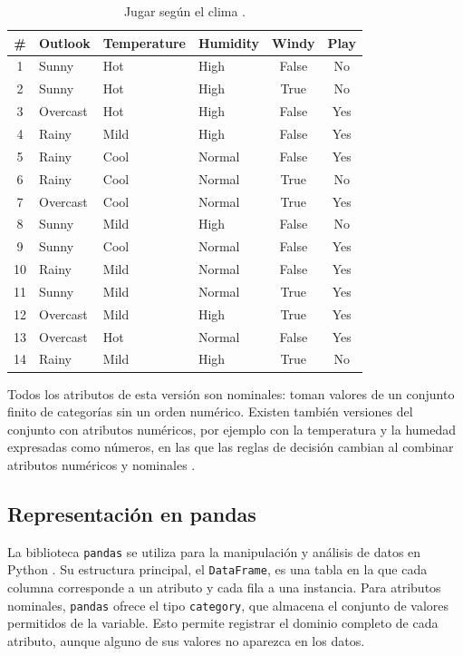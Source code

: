 \documentclass[11pt,letterpaper]{article}
\begin{document}
\begin{table}[htbp]
\centering
\caption{Jugar según el clima \parencite{tecnm2026_documento_fuente}.}
\label{tab:weather}
\begin{tabular}{clllcc}
\hline
\textbf{\#} & \textbf{Outlook} & \textbf{Temperature} & \textbf{Humidity} & \textbf{Windy} & \textbf{Play} \\
\hline
1  & Sunny    & Hot  & High   & False & No  \\
2  & Sunny    & Hot  & High   & True  & No  \\
3  & Overcast & Hot  & High   & False & Yes \\
4  & Rainy    & Mild & High   & False & Yes \\
5  & Rainy    & Cool & Normal & False & Yes \\
6  & Rainy    & Cool & Normal & True  & No  \\
7  & Overcast & Cool & Normal & True  & Yes \\
8  & Sunny    & Mild & High   & False & No  \\
9  & Sunny    & Cool & Normal & False & Yes \\
10 & Rainy    & Mild & Normal & False & Yes \\
11 & Sunny    & Mild & Normal & True  & Yes \\
12 & Overcast & Mild & High   & True  & Yes \\
13 & Overcast & Hot  & Normal & False & Yes \\
14 & Rainy    & Mild & High   & True  & No  \\
\hline
\end{tabular}
\end{table}

Todos los atributos de esta versión son nominales: toman valores de un conjunto finito de categorías sin un orden numérico. Existen también versiones del conjunto con atributos numéricos, por ejemplo con la temperatura y la humedad expresadas como números, en las que las reglas de decisión cambian al combinar atributos numéricos y nominales \parencite{tecnm2026_documento_fuente}.

\subsection{Representación en pandas}

La biblioteca \texttt{pandas} se utiliza para la manipulación y análisis de datos en Python \parencite{tecnm2026_documento_fuente}. Su estructura principal, el \texttt{DataFrame}, es una tabla en la que cada columna corresponde a un atributo y cada fila a una instancia. Para atributos nominales, \texttt{pandas} ofrece el tipo \texttt{category}, que almacena el conjunto de valores permitidos de la variable. Esto permite registrar el dominio completo de cada atributo, aunque alguno de sus valores no aparezca en los datos.
\end{document}
